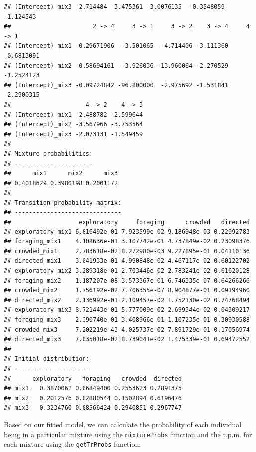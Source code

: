 \documentclass[12pt]{article}\usepackage[]{graphicx}\usepackage[]{color}
\makeatletter
\newenvironment{kframe}{%
 \def\at@end@of@kframe{}%
 \ifinner\ifhmode%
  \def\at@end@of@kframe{\end{minipage}}%
  \begin{minipage}{\columnwidth}%
 \fi\fi%
 \def\FrameCommand##1{\hskip\@totalleftmargin \hskip-\fboxsep
 \colorbox{shadecolor}{##1}\hskip-\fboxsep
     \hskip-\linewidth \hskip-\@totalleftmargin \hskip\columnwidth}%
 \MakeFramed {\advance\hsize-\width
   \@totalleftmargin\z@ \linewidth\hsize
   \@setminipage}}%
 {\par\unskip\endMakeFramed%
 \at@end@of@kframe}
\newenvironment{knitrout}{}{} %
\makeatother
\begin{document}
\begin{knitrout}
\begin{kframe}
\begin{verbatim}
## (Intercept)_mix3 -2.714484 -3.475361 -3.0076135  -0.3548059  -1.124543
##                       2 -> 4     3 -> 1     3 -> 2    3 -> 4     4 -> 1
## (Intercept)_mix1 -0.29671906  -3.501065  -4.714406 -3.111360 -0.6813091
## (Intercept)_mix2  0.58694161  -3.926036 -13.960064 -2.270529 -1.2524123
## (Intercept)_mix3 -0.09724842 -96.800000  -2.975692 -1.531841 -2.2900315
##                     4 -> 2    4 -> 3
## (Intercept)_mix1 -2.488782 -2.599644
## (Intercept)_mix2 -3.567966 -3.753564
## (Intercept)_mix3 -2.073131 -1.549459
## 
## Mixture probabilities:
## ----------------------
##      mix1      mix2      mix3 
## 0.4018629 0.3980198 0.2001172 
## 
## Transition probability matrix:
## ------------------------------
##                   exploratory     foraging      crowded   directed
## exploratory_mix1 6.816492e-01 7.923599e-02 9.186948e-03 0.22992783
## foraging_mix1    4.108636e-01 3.107742e-01 4.737849e-02 0.23098376
## crowded_mix1     2.783618e-02 8.272980e-03 9.227895e-01 0.04110136
## directed_mix1    3.041933e-01 4.990848e-02 4.467117e-02 0.60122702
## exploratory_mix2 3.289318e-01 2.703446e-02 2.783241e-02 0.61620128
## foraging_mix2    1.187207e-08 3.573367e-01 6.746335e-07 0.64266266
## crowded_mix2     1.756192e-02 7.706355e-07 8.904877e-01 0.09194960
## directed_mix2    2.136992e-01 2.109457e-02 1.752130e-02 0.74768494
## exploratory_mix3 8.721443e-01 5.777009e-02 2.699344e-02 0.04309217
## foraging_mix3    2.390740e-01 3.408966e-01 1.107235e-01 0.30930588
## crowded_mix3     7.202219e-43 4.025737e-02 7.891729e-01 0.17056974
## directed_mix3    7.035018e-02 8.739041e-02 1.475339e-01 0.69472552
## 
## Initial distribution:
## ---------------------
##      exploratory   foraging   crowded  directed
## mix1   0.3870062 0.06849400 0.2553623 0.2891375
## mix2   0.2012576 0.02880544 0.1502894 0.6196476
## mix3   0.3234760 0.08566424 0.2940851 0.2967747
\end{verbatim}
\end{kframe}
\end{knitrout}
\noindent Based on our fitted model, we can calculate the probability of each individual being in a particular mixture using the \verb|mixtureProbs| function and the t.p.m. for each mixture using the \verb|getTrProbs| function:
\end{document}
